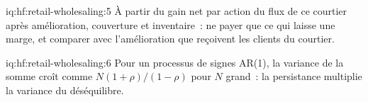 \begin{solution}{iq:hf:retail-wholesaling:5}
À partir du gain net par action du flux de ce courtier après amélioration, couverture et inventaire~: ne payer que ce qui laisse une marge, et comparer avec
l'amélioration que reçoivent les clients du courtier.
\end{solution}

\begin{solution}{iq:hf:retail-wholesaling:6}
Pour un processus de signes AR(1), la variance de la somme croît comme $N(1+\rho)/(1-\rho)$ pour $N$ grand~: la persistance multiplie la variance du déséquilibre.
\end{solution}
